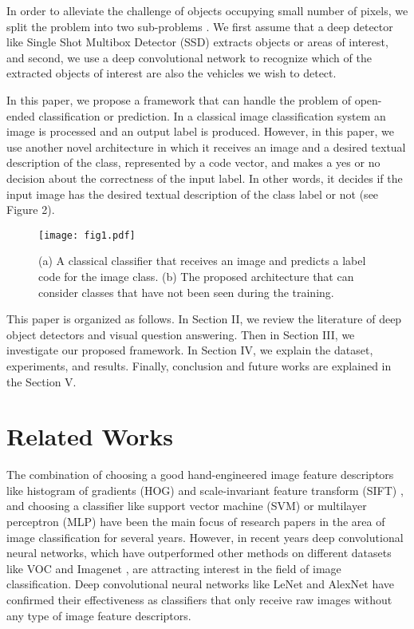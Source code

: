 \documentclass[conference]{IEEEtran}
\begin{document}
In order to alleviate the challenge of objects occupying small number of pixels, we split the problem into two sub-problems \cite{fusion}. We first assume that a deep detector like Single Shot Multibox Detector (SSD) \cite{ssd} extracts objects or areas of interest, and second, we use a deep convolutional network to recognize which of the extracted objects of interest are also the vehicles we wish to detect.

In this paper, we propose a framework that can handle the problem of open-ended classification or prediction. In a classical image classification system an image is processed and an output label is produced. However, in this paper, we use another novel architecture in which it receives an image and a desired textual description of the class, represented by a code vector, and makes a yes or no decision about the correctness of the input label. In other words, it decides if the input image has the desired textual description of the class label or not (see Figure 2).

\begin{figure}[!t]
\centering
\texttt{[image: fig1.pdf]}\\
\caption{(a) A classical classifier that receives an image and predicts a label code for the image class. (b) The proposed architecture that can consider classes that have not been seen during the training.}
\label{fig_graph1}
\end{figure}

This paper is organized as follows. In Section II, we review the literature of deep object detectors and visual question answering. Then in Section III, we investigate our proposed framework. In Section IV, we explain the dataset, experiments, and results. Finally, conclusion and future works are explained in the Section V.


\section{Related Works}

The combination of choosing a good hand-engineered image feature descriptors like histogram of gradients (HOG) \cite{hog} and scale-invariant feature transform (SIFT) \cite{sift}, and choosing a classifier like support vector machine (SVM) \cite{svm} or multilayer perceptron (MLP) have been the main focus of research papers in the area of image classification for several years. However, in recent years deep convolutional neural networks, which have outperformed other methods on different datasets like VOC \cite{voc} and Imagenet \cite{imagenet}, are attracting interest in the field of image classification. Deep convolutional neural networks like LeNet \cite{lenet} and AlexNet \cite{alex} have confirmed their effectiveness as classifiers that only receive raw images without any type of image feature descriptors.
\end{document}
